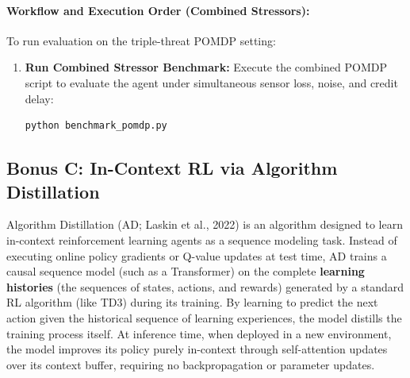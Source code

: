\documentclass[11pt,a4paper]{article}
\begin{document}
\paragraph{Workflow and Execution Order (Combined Stressors):}
To run evaluation on the triple-threat POMDP setting:
\begin{enumerate}
    \item \textbf{Run Combined Stressor Benchmark:} Execute the combined POMDP script to evaluate the agent under simultaneous sensor loss, noise, and credit delay:
    \begin{lstlisting}[language=bash]
    python benchmark_pomdp.py
    \end{lstlisting}
\end{enumerate}

\FloatBarrier

\subsection{Bonus C: In-Context RL via Algorithm Distillation}
Algorithm Distillation (AD; Laskin et al., 2022) is an algorithm designed to learn in-context reinforcement learning agents as a sequence modeling task. Instead of executing online policy gradients or Q-value updates at test time, AD trains a causal sequence model (such as a Transformer) on the complete \textbf{learning histories} (the sequences of states, actions, and rewards) generated by a standard RL algorithm (like TD3) during its training. By learning to predict the next action given the historical sequence of learning experiences, the model distills the training process itself. At inference time, when deployed in a new environment, the model improves its policy purely in-context through self-attention updates over its context buffer, requiring no backpropagation or parameter updates.
\end{document}
